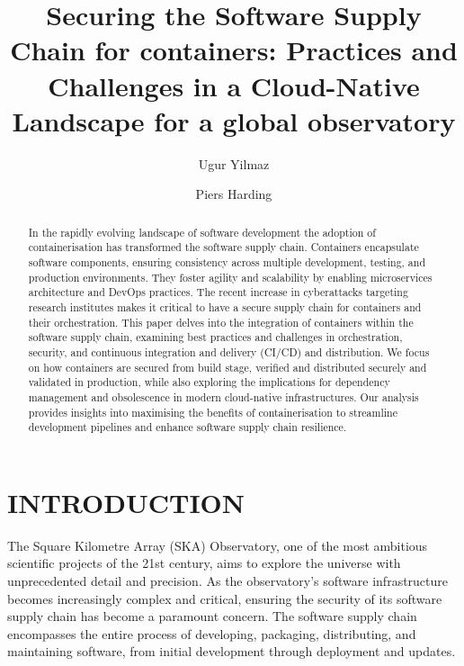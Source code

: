 \documentclass[a4paper]{spie}  %
\title{Securing the Software Supply Chain for containers: Practices and Challenges in a Cloud-Native Landscape for a global observatory}
\author[a]{Ugur Yilmaz}
\author[a]{Piers Harding}
\affil[a]{SKA Observatory, United Kingdom}
\begin{document}
 
\maketitle

\begin{abstract}
In the rapidly evolving landscape of software development the adoption of containerisation has transformed the software supply chain. Containers encapsulate software components, ensuring consistency across multiple development, testing, and production environments. They foster agility and scalability by enabling microservices architecture and DevOps practices. The recent increase in cyberattacks targeting research institutes makes it critical to have a secure supply chain for containers and their orchestration. This paper delves into the integration of containers within the software supply chain, examining best practices and challenges in orchestration, security, and continuous integration and delivery (CI/CD) and distribution. We focus on how containers are secured from build stage, verified and distributed securely and validated in production, while also exploring the implications for dependency management and obsolescence in modern cloud-native infrastructures. Our analysis provides insights into maximising the benefits of containerisation to streamline development pipelines and enhance software supply chain resilience.
\end{abstract}


\section{INTRODUCTION}
The Square Kilometre Array (SKA) Observatory, one of the most ambitious scientific projects of the 21st century, aims to explore the universe with unprecedented detail and precision. As the observatory's software infrastructure becomes increasingly complex and critical, ensuring the security of its software supply chain has become a paramount concern. The software supply chain encompasses the entire process of developing, packaging, distributing, and maintaining software, from initial development through deployment and updates.
\end{document}
